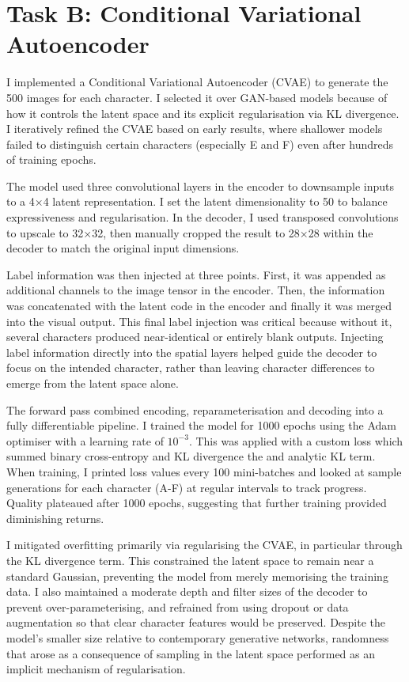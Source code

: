 \documentclass[11pt]{report} %
\begin{document}
\section{Task B: Conditional Variational Autoencoder}
I implemented a Conditional Variational Autoencoder (CVAE) to generate the 500 images for each character. I selected it over GAN-based models because of how it controls the latent space and its explicit regularisation via KL divergence. I iteratively refined the CVAE based on early results, where shallower models failed to distinguish certain characters (especially E and F) even after hundreds of training epochs.

The model used three convolutional layers in the encoder to downsample inputs to a 4×4 latent representation. I set the latent dimensionality to 50 to balance expressiveness and regularisation. In the decoder, I used transposed convolutions to upscale to 32×32, then manually cropped the result to 28×28 within the decoder to match the original input dimensions.

\noindent Label information was then injected at three points. First, it was appended as additional channels to the image tensor in the encoder. Then, the information was concatenated with the latent code in the encoder and finally it was merged into the visual output. This final label injection was critical because without it, several characters produced near-identical or entirely blank outputs. Injecting label information directly into the spatial layers helped guide the decoder to focus on the intended character, rather than leaving character differences to emerge from the latent space alone.

The forward pass combined encoding, reparameterisation and decoding into a fully differentiable pipeline. I trained the model for 1000 epochs using the Adam optimiser with a learning rate of $10^{-3}$. This was applied with a custom loss which summed binary cross-entropy and KL divergence the and analytic KL term.
When training, I printed loss values every
100 mini-batches and looked at sample generations for each character (A-F) at regular intervals to track progress. Quality
plateaued after 1000 epochs, suggesting that further training provided diminishing returns.

I mitigated overfitting primarily via regularising the CVAE, in particular through the KL divergence term. This constrained the latent space to remain near a standard Gaussian, preventing the model from merely memorising the training data. I also maintained a moderate depth and filter sizes of the decoder to prevent over-parameterising, and refrained from using dropout or data augmentation so that clear character features would be preserved. Despite the model's smaller size relative to contemporary generative networks, randomness that arose as a consequence of sampling in the latent space performed as an implicit mechanism of regularisation.
\end{document}
